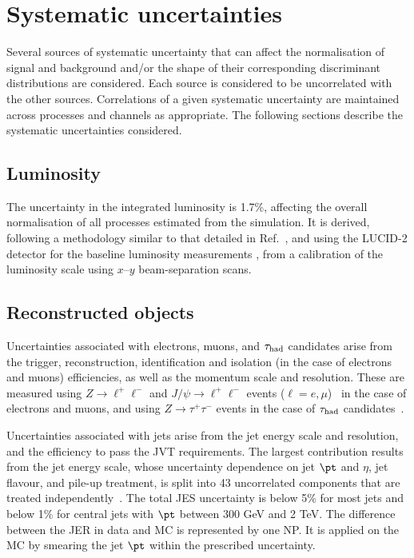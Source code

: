 \section{Systematic uncertainties}
\label{sec:systematics}
				   
Several sources of systematic uncertainty that can affect the normalisation of signal 
and background and/or the shape of their corresponding discriminant distributions are considered.
Each source is considered to be uncorrelated with the other sources.  
Correlations of a given systematic uncertainty are maintained across processes and channels 
as appropriate.
The following sections describe the systematic uncertainties considered.

\subsection{Luminosity}
\label{sec:syst_lumi}

The uncertainty in the integrated luminosity is 1.7\%, affecting the overall normalisation of all processes estimated from the simulation. 
It is derived, following a methodology similar to that detailed in Ref.~\cite{Aaboud:2016hhf}, and using the LUCID-2 detector 
for the baseline luminosity measurements \cite{Avoni:2018iuv}, from a calibration of the luminosity scale using $x$--$y$ beam-separation scans.

\subsection{Reconstructed objects}
\label{sec:syst_objects}

Uncertainties associated with electrons, muons, and $\tau_{\mathrm{had}}$ candidates arise from the trigger, reconstruction,  
identification and isolation (in the case of electrons and muons) efficiencies, as well as the momentum scale and resolution. 
These are measured using $Z\to \ell^+\ell^-$ and $J/\psi\to \ell^+\ell^-$ events ($\ell =e, \mu$)~\cite{ATLAS-CONF-2016-024,Aad:2016jkr} 
in the case of electrons and muons, and using $Z\to \tau^+\tau^-$ events in the case of $\tau_{\mathrm{had}}$ candidates~\cite{ATLAS-CONF-2017-029}.

Uncertainties associated with jets arise from the jet energy scale
and resolution, and the efficiency to pass the JVT requirements. 
The largest contribution results from the jet energy scale, whose uncertainty dependence on jet $\pt$ and $\eta$, jet flavour, and pile-up treatment, 
is split into 43 uncorrelated components that are treated independently~\cite{Aaboud:2017jcu}. The total JES uncertainty is
below 5\% for most jets and below 1\% for central jets with $\pt$ between 300 GeV and 2 TeV. The difference between the JER
in data and MC is represented by one NP. It is applied on the MC by smearing the jet $\pt$ within the prescribed uncertainty.

